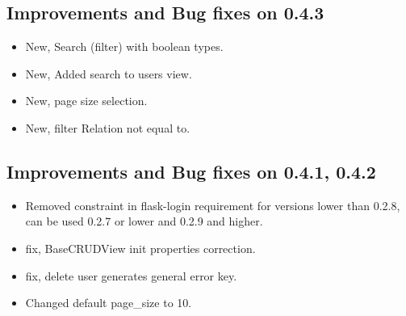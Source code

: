 \documentclass[letterpaper,10pt,english]{sphinxmanual}
\begin{document}
\subsection{Improvements and Bug fixes on 0.4.3}
\label{versions:improvements-and-bug-fixes-on-0-4-3}\begin{itemize}
\item {} 
New, Search (filter) with boolean types.

\item {} 
New, Added search to users view.

\item {} 
New, page size selection.

\item {} 
New, filter Relation not equal to.

\end{itemize}


\subsection{Improvements and Bug fixes on 0.4.1, 0.4.2}
\label{versions:improvements-and-bug-fixes-on-0-4-1-0-4-2}\begin{itemize}
\item {} 
Removed constraint in flask-login requirement for versions lower than 0.2.8, can be used 0.2.7 or lower and 0.2.9 and higher.

\item {} 
fix, BaseCRUDView init properties correction.

\item {} 
fix, delete user generates general error key.

\item {} 
Changed default page\_size to 10.

\end{itemize}
\end{document}
